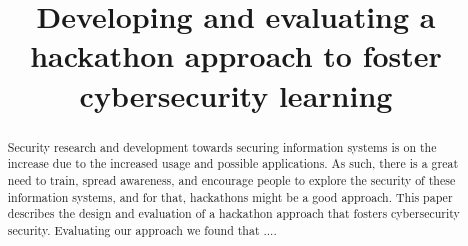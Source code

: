 \documentclass[runningheads]{llncs}
\begin{document}
%
\title{Developing and evaluating a hackathon approach to foster cybersecurity learning}
%
%

%
\authorrunning{}
%
\maketitle              %
%
\begin{abstract}
Security research and development towards securing information systems%
is on the increase due to the increased usage and possible applications. As such, there is a great need to train, spread awareness, and encourage people to explore the security of these information systems, and for that, hackathons might be a good approach. This paper describes the design and evaluation of a hackathon approach that fosters cybersecurity security. Evaluating our approach we found that ....
\end{abstract}
%
%
\end{document}
